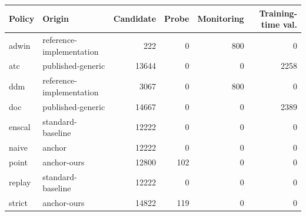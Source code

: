 \begin{table}[t]
\medskip
\begin{tabular}{l l r r r r}
\toprule
Policy & Origin & Candidate & Probe & Monitoring & Training-time val. \\
\midrule
adwin & reference-implementation & 222 & 0 & 800 & 0 \\
atc & published-generic & 13644 & 0 & 0 & 2258 \\
ddm & reference-implementation & 3067 & 0 & 800 & 0 \\
doc & published-generic & 14667 & 0 & 0 & 2389 \\
enscal & standard-baseline & 12222 & 0 & 0 & 0 \\
naive & anchor & 12222 & 0 & 0 & 0 \\
point & anchor-ours & 12800 & 102 & 0 & 0 \\
replay & standard-baseline & 12222 & 0 & 0 & 0 \\
strict & anchor-ours & 14822 & 119 & 0 & 0 \\
\bottomrule
\end{tabular}
\end{table}
